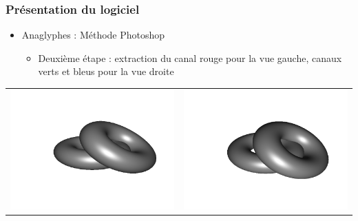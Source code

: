 \documentclass{beamer}
\begin{document}
%
\begin{frame}
\frametitle{Présentation du logiciel}
\begin{itemize}[label=$\bullet$]
\item Anaglyphes : Méthode Photoshop \cite{stereoAnaglyph}
	\begin{itemize}[label=$\circ$]
	\item Deuxième étape : extraction du canal rouge pour la vue gauche, canaux verts et bleus pour la vue droite 
	\end{itemize}
\end{itemize}
\begin{tabular}{l|r}
\includegraphics[scale=0.15]{flip1.png}
&
\includegraphics[scale=0.15]{flip2.png}
\end{tabular}

\end{frame}
\end{document}
